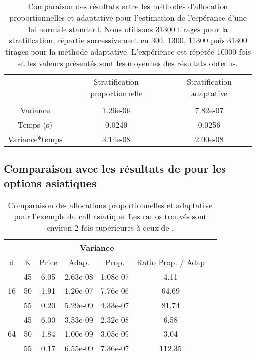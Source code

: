 \documentclass[12pt,a4paper]{report}
\begin{document}
\begin{table}[H]
\centering
	\begin{tabular*}{\textwidth}{@{\extracolsep{\fill}}ccc}
		\hline
		 			    & Stratification proportionnelle 		& Stratification adaptative \\ 
		 			    																	\\
		\hline
		Variance	    & 1.26e-06		                        & 7.82e-07	                \\
		Temps (s)      	& 0.0249		                        & 0.0256                    \\
		Variance*temps	& 3.14e-08                              & 2.00e-08		            \\
		\hline
	\end{tabular*}
\caption{Comparaison des résultats entre les méthodes d'allocation proportionnelles et adaptative pour l'estimation de l'espérance d'une loi normale standard. Nous utilisons 31300 tirages pour la stratification, répartie successivement en 300, 1300, 11300 puis 31300 tirages pour la méthode adaptative. L'expérience est répétée 10000 fois et les valeurs présentés sont les moyennes des résultats obtenus.}
\label{tab:strat_comparaison_proportionnelle_adaptative}
\end{table}

\subsection{Comparaison avec les résultats de \cite{EJ08} pour les options asiatiques}

\begin{table}[H]
\centering
	\begin{tabular*}{\textwidth}{@{\extracolsep{\fill}}ccccccc}
		\hline
			                &   &   & \multicolumn{2}{|c|}{Variance} &                      \\ 
		\hline
		
		d	                & K  & Price  & Adap.    & Prop.    & Ratio Prop. / Adap        \\
		\hline
		\multirow{3}{*}{16} & 45 & 6.05   & 2.63e-08 & 1.08e-07 & 4.11	                    \\
							& 50 & 1.91   & 1.20e-07 & 7.76e-06 & 64.69	                    \\
							& 55 & 0.20   & 5.29e-09 & 4.33e-07 & 81.74	                    \\
	 \hline
		\multirow{3}{*}{64} & 45 & 6.00   & 3.53e-09 & 2.32e-08 & 6.58	                    \\
							& 50 & 1.84   & 1.00e-09 & 3.05e-09 & 3.04                      \\
							& 55 & 0.17   & 6.55e-09 & 7.36e-07 & 112.35	                \\
		\hline
	\end{tabular*}
\caption{Comparaison des allocations proportionnelles et adaptative pour l'exemple du call asiatique. Les ratios trouvés sont environ 2 fois supérieures à ceux de \cite{EJ08}.}
\label{tab:strat_asian_call}
\end{table}
\end{document}
